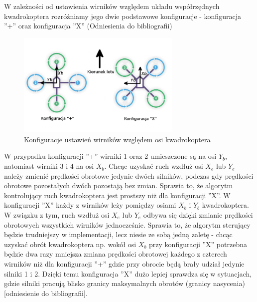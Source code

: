 W zależności od ustawienia wirników względem układu współrzędnych kwadrokoptera rozróżniamy jego dwie podstawowe konfiguracje - konfiguracja ''+''  oraz konfiguracja ''X'' (Odniesienia do bibliografii)

\begin{figure}[htbp]
	\centering
		\includegraphics[width=0.7\textwidth]{Pictures/quadrotor_configurations.png}
	\caption[Konfiguracje kwadrokopterów]{Konfiguracje ustawień wirników względem osi kwadrokoptera}
	\label{fig:quadrotor_configurations.png}
\end{figure}

W przypadku konfiguracji ''+'' wirniki 1 oraz 2 umieszczone są na osi $Y_b$, natomiast wirniki 3 i 4 na osi $X_b $. Chcąc uzyskać ruch wzdłuż osi $X_e$ lub $Y_e$ należy zmienić prędkości obrotowe jedynie dwóch silników, podczas gdy prędkości obrotowe pozostałych dwóch pozostają bez zmian. Sprawia to, że algorytm kontrolujący ruch kwadrokoptera jest prostszy niż dla konfiguracji ''X''. W konfiguracji ''X'' każdy z wirników leży pomiędzy osiami $X_b$ i $Y_b$ kwadrokoptera. W związku z tym, ruch wzdłuż osi $X_e$ lub $Y_e$ odbywa się dzięki zmianie prędkości obrotowych wszystkich wirników jednocześnie. Sprawia to, że algorytm sterujący będzie trudniejszy w implementacji, lecz niesie ze sobą jedną zaletę - chcąc uzyskać obrót kwadrokoptera np. wokół osi $X_b$ przy konfiguracji ''X'' potrzebna będzie dwa razy mniejsza zmiana prędkości obrotowej każdego z czterech wirników niż dla konfiguracji ''+'' gdzie przy obrocie będą brały udział jedynie silniki 1 i 2. Dzięki temu konfiguracja ''X'' dużo lepiej sprawdza się w sytuacjach, gdzie silniki pracują blisko granicy maksymalnych obrotów (granicy nasycenia) [odniesienie do bibliografii].

